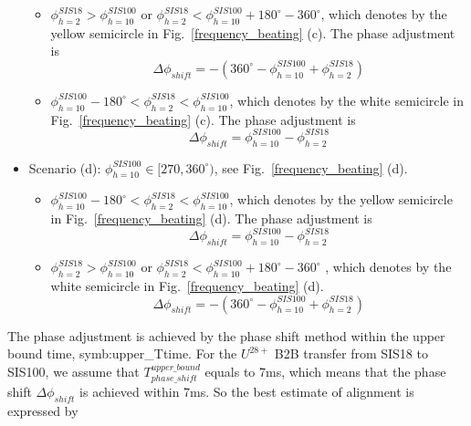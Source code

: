 \begin{itemize}
	\begin{itemize}
		\item $\phi_{h=2}^{SIS18} > \phi_{h=10}^{SIS100}$ or  $\phi_{h=2}^{SIS18} < \phi_{h=10}^{SIS100} +180^\circ - 360^\circ $, which denotes by the yellow semicircle in Fig.~\ref{frequency_beating} (c). The phase adjustment is
    \begin{equation}			
\Delta \phi_{shift}=-(360^\circ - \phi_{h=10}^{SIS100}+ \phi_{h=2}^{SIS18})
    \end{equation}
    		\item $\phi_{h=10}^{SIS100}-180^\circ < \phi_{h=2}^{SIS18}< \phi_{h=10}^{SIS100}$, which denotes by the white semicircle in Fig.~\ref{frequency_beating} (c). The phase adjustment is
    \begin{equation}			
\Delta \phi_{shift}=\phi_{h=10}^{SIS100}-\phi_{h=2}^{SIS18}
    \end{equation}
	\end{itemize}
    \item Scenario (d): $\phi_{h=10}^{SIS100}\in [270,360^\circ)$, see Fig.~\ref{frequency_beating} (d).

	\begin{itemize}
		\item $\phi_{h=10}^{SIS100}-180^\circ < \phi_{h=2}^{SIS18}< \phi_{h=10}^{SIS100}$, which denotes by the yellow semicircle in Fig.~\ref{frequency_beating} (d). The phase adjustment is 
	    \begin{equation}	
\Delta \phi_{shift}=\phi_{h=10}^{SIS100}-\phi_{h=2}^{SIS18}	
    \end{equation}
    		\item $\phi_{h=2}^{SIS18} > \phi_{h=10}^{SIS100}$ or  $\phi_{h=2}^{SIS18} < \phi_{h=10}^{SIS100} +180^\circ - 360^\circ $ , which denotes by the white semicircle in Fig.~\ref{frequency_beating} (d). 
    \begin{equation}			
\Delta \phi_{shift}=-(360^\circ - \phi_{h=10}^{SIS100}+ \phi_{h=2}^{SIS18})
    \end{equation}
	\end{itemize}
\end{itemize}

The phase adjustment is achieved by the phase shift method within the upper bound time, \gls{symb:upper_Ttime}. For the $U^{28+}$ B2B transfer from SIS18 to SIS100, we assume that $T_{phase\_ shift}^{upper\_ bound}$ equals to 7ms, which means that the phase shift $\Delta \phi_{shift}$ is achieved within 7ms. So the best estimate of alignment is expressed by 

